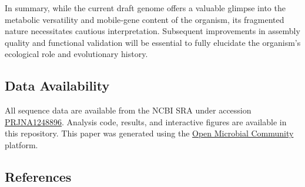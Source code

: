 \documentclass[
  11pt,
]{article}
\begin{document}
In summary, while the current draft genome offers a valuable glimpse
into the metabolic versatility and mobile‑gene content of the organism,
its fragmented nature necessitates cautious interpretation. Subsequent
improvements in assembly quality and functional validation will be
essential to fully elucidate the organism's ecological role and
evolutionary history.

\subsection{Data Availability}\label{data-availability}

All sequence data are available from the NCBI SRA under accession
\href{https://www.ncbi.nlm.nih.gov/bioproject/PRJNA1248896}{PRJNA1248896}.
Analysis code, results, and interactive figures are available in this
repository. This paper was generated using the
\href{https://github.com/rec3141/omc-platform}{Open Microbial Community}
platform.

\subsection*{References}\label{references}

\protect{}\label{refs}
\end{document}
